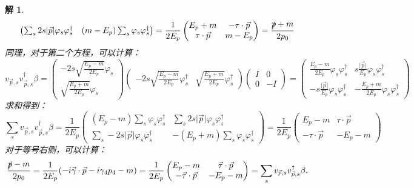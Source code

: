 \documentclass[UTF8,10pt,a4paper]{article}
\theoremstyle{Problem}%
\theoremstyle{Solution}%
\newtheorem*{sol}{解}%
\begin{document}
\begin{sol}
\[\begin{pmatrix}
        \sum_s 2s\vert \vec{p} \vert \varphi_s \varphi_s^\dagger & (m-E_p) \sum_s \varphi_s \varphi_s^\dagger 
    \end{pmatrix} = \frac{1}{2E_p}
    \begin{pmatrix}
        E_p+m & -\tau \cdot \vec{p} \\
        \tau \cdot \vec{p} & m-E_p
    \end{pmatrix} = \frac{\slashed{p} + m}{2p_0}
\]
同理，对于第二个方程，可以计算：
\[
    v_{\vec{p},s}v_{\vec{p},s}^\dagger \beta = \begin{pmatrix}
        -2s\sqrt{\frac{E_p-m}{2E_p}}\varphi_s \\
        \sqrt{\frac{E_p+m}{2E_p}}\varphi_s
    \end{pmatrix}
    \begin{pmatrix}
        -2s\sqrt{\frac{E_p-m}{2E_p}}\varphi_s^\dagger & \sqrt{\frac{E_p+m}{2E_p}}\varphi_s^\dagger
    \end{pmatrix}
    \begin{pmatrix}
        I & 0 \\
        0 & -I
    \end{pmatrix} = 
    \begin{pmatrix}
        \frac{E_p - m}{2E_p} \varphi_s \varphi_s^\dagger & s \frac{\vert \vec{p} \vert}{E_p} \varphi_s \varphi_s^\dagger \\
        -s\frac{\vert \vec{p} \vert}{E_p} \varphi_s \varphi_s^\dagger & -\frac{E_p+m}{2E_p}\varphi_s \varphi_s^\dagger
    \end{pmatrix}
\]
求和得到：
\[
    \sum_s v_{\vec{p},s} v_{\vec{p},s}^\dagger \beta = \frac{1}{2E_p} \begin{pmatrix}
        (E_p-m)\sum_s \varphi_s \varphi_s^\dagger & \sum_s 2s \vert \vec{p} \vert \varphi_s \varphi_s^\dagger \\
        \sum_s -2s\vert \vec{p} \vert \varphi_s \varphi_s^\dagger & -(E_p+m) \sum_s \varphi_s \varphi_s^\dagger
    \end{pmatrix} = \frac{1}{2E_p} 
    \begin{pmatrix}
        E_p - m & \tau \cdot \vec{p} \\
        -\tau \cdot \vec{p} & -E_p-m
     \end{pmatrix}
\]
对于等号右侧，可以计算：
\[
    \frac{\slashed{p} - m}{2p_0} = \frac{1}{2E_p} (-i\vec{\gamma}\cdot\vec{p} - i\gamma_4p_4 - m) = \frac{1}{2E_p}\begin{pmatrix}
        E_p - m & \vec{\tau} \cdot \vec{p} \\
        -\vec{\tau} \cdot \vec{p} & - E_p - m
    \end{pmatrix} = \sum_s v_{\vec{p},s} v_{\vec{p},s}^\dagger \beta.
\]
\end{sol}
\end{document}
